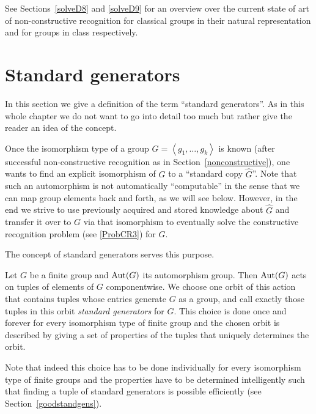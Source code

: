 See Sections~\ref{solveD8} and \ref{solveD9} for an overview over the
current state of art of non-constructive recognition for classical
groups in their natural representation and for groups in class 
respectively.

\section{Standard generators}
\label{standardgens}

In this section we give a definition of the term
``standard generators''. As in this whole chapter we do not want to go
into detail too much but rather give the reader an idea of the
concept.

Once the isomorphism type of a group $G = \left< g_1, \ldots,
g_k\right>$ is known (after successful non-con\-struc\-tive recognition as in
Section~\ref{nonconstructive}), one wants to find an explicit
isomorphism of $G$ to a ``standard copy $\hat G$''. Note that such an
automorphism is not automatically ``computable'' in the sense that 
we can map group elements back and forth, as we will see below.
However, in the end we strive to use previously acquired and stored
knowledge about $\hat G$ and transfer it over to $G$ via that
isomorphism to eventually solve the constructive recognition problem (see
\ref{ProbCR3}) for $G$.

The concept of standard generators serves this purpose.

\begin{Def}
    Let $G$ be a finite group and $\Aut(G)$ its automorphism group. Then
    $\Aut(G)$ acts on tuples of elements of $G$ componentwise. We choose
    one orbit of this action that contains tuples whose entries
    generate $G$ as a group, and call exactly those tuples in this
    orbit \emph{standard generators} for $G$. This choice is done once
    and forever for every isomorphism type of finite group and the
    chosen orbit is described by giving a set of properties of the
    tuples that uniquely determines the orbit.
\end{Def}

\begin{Rem}
Note that indeed this choice has to be done individually for every
isomorphism type of finite groups and the properties have to be
determined intelligently such that finding a tuple of standard
generators is possible efficiently (see Section~\ref{goodstandgens}).
\end{Rem}

